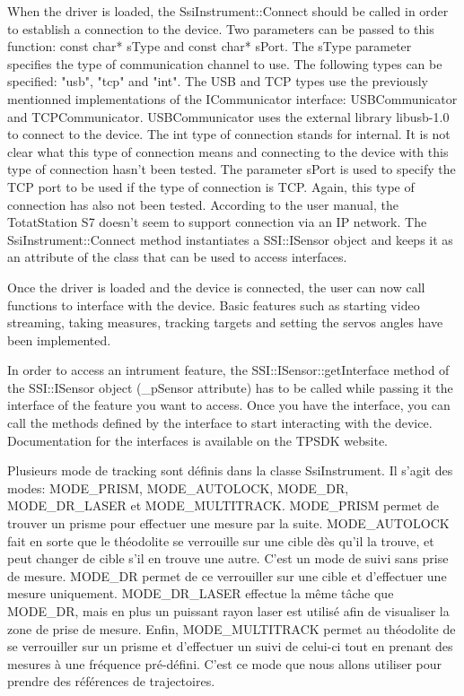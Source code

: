\documentclass[10pt,letterpaper,oneside]{article}
\begin{document}
When the driver is loaded, the SsiInstrument::Connect should be called in order to establish a connection to the device. 
Two parameters can be passed to this function: const char* sType and const char* sPort. 
The sType parameter specifies the type of communication channel to use. 
The following types can be specified: "usb", "tcp" and "int". 
The USB and TCP types use the previously mentionned implementations of the ICommunicator interface: USBCommunicator and TCPCommunicator. 
USBCommunicator uses the external library libusb-1.0 to connect to the device. 
The int type of connection stands for internal. 
It is not clear what this type of connection means and connecting to the device with this type of connection hasn't been tested. 
The parameter sPort is used to specify the TCP port to be used if the type of connection is TCP.
Again, this type of connection has also not been tested. 
According to the user manual, the TotatStation S7 doesn't seem to support connection via an IP network. 
The SsiInstrument::Connect method instantiates a SSI::ISensor object and keeps it as an attribute of the class that can be used to access interfaces.

Once the driver is loaded and the device is connected, the user can now call functions to interface with the device. 
Basic features such as starting video streaming, taking measures, tracking targets and setting the servos angles have been implemented.

In order to access an intrument feature, the SSI::ISensor::getInterface method of the SSI::ISensor object (\_pSensor attribute) has to be called while passing it the interface of the feature you want to access. 
Once you have the interface, you can call the methods defined by the interface to start interacting with the device. 
Documentation for the interfaces is available on the TPSDK website.

Plusieurs mode de tracking sont définis dans la classe SsiInstrument. 
Il s'agit des modes: MODE\_PRISM, MODE\_AUTOLOCK, MODE\_DR, MODE\_DR\_LASER et MODE\_MULTITRACK.
MODE\_PRISM permet de trouver un prisme pour effectuer une mesure par la suite.
MODE\_AUTOLOCK fait en sorte que le théodolite se verrouille sur une cible dès qu'il la trouve, et peut changer de cible s'il en trouve une autre. 
C'est un mode de suivi sans prise de mesure.
MODE\_DR permet de ce verrouiller sur une cible et d'effectuer une mesure uniquement.
MODE\_DR\_LASER effectue la même tâche que MODE\_DR, mais en plus un puissant rayon laser est utilisé afin de visualiser la zone de prise de mesure.
Enfin, MODE\_MULTITRACK permet au théodolite de se verrouiller sur un prisme et d'effectuer un suivi de celui-ci tout en prenant des mesures à une fréquence pré-défini.
C'est ce mode que nous allons utiliser pour prendre des références de trajectoires.
\end{document}
